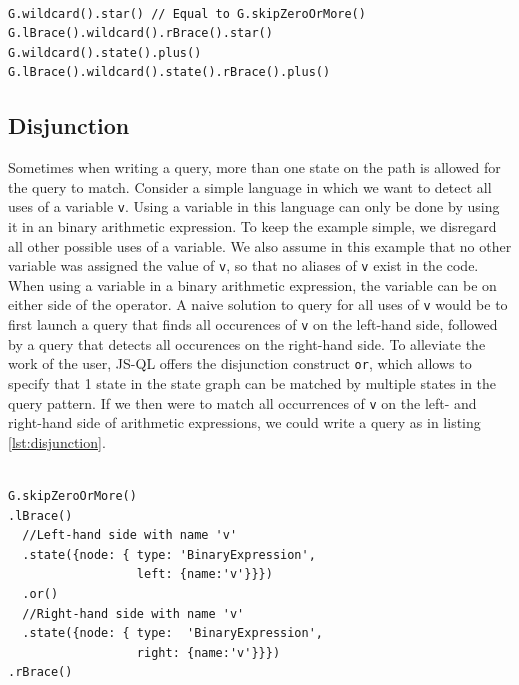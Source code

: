 \begin{lstlisting}[label={lst:KleeneOperations},language=JSQL,caption=Kleene operations differences,mathescape=true]  % float=t?

G.wildcard().star() // Equal to G.skipZeroOrMore()
G.lBrace().wildcard().rBrace().star()
G.wildcard().state().plus()
G.lBrace().wildcard().state().rBrace().plus()
\end{lstlisting}

\subsection{Disjunction}

Sometimes when writing a query, more than one state on the path is allowed for the query to match. Consider a simple language in which we want to detect all uses of a variable \texttt{v}. Using a variable in this language can only be done by using it in an binary arithmetic expression. To keep the example simple, we disregard all other possible uses of a variable. We also assume in this example that no other variable was assigned the value of \texttt{v}, so that no aliases of \texttt{v} exist in the code. When using a variable in a binary arithmetic expression, the variable can be on either side of the operator. A naive solution to query for all uses of \texttt{v} would be to first launch a query that finds all occurences of \texttt{v} on the left-hand side, followed by a query that detects all occurences on the right-hand side. To alleviate the work of the user, JS-QL offers the disjunction construct \texttt{or}, which allows to specify that 1 state in the state graph can be matched by multiple states in the query pattern. If we then were to match all occurrences of \texttt{v} on the left- and right-hand side of arithmetic expressions, we could write a query as in listing \ref{lst:disjunction}.

\begin{lstlisting}[label={lst:disjunction},language=JSQL,caption=The JS-QL disjunction operator,mathescape=true]  % float=t?

G.skipZeroOrMore()
.lBrace()
  //Left-hand side with name 'v'
  .state({node: { type: 'BinaryExpression',
                  left: {name:'v'}}})      
  .or()
  //Right-hand side with name 'v'
  .state({node: { type:  'BinaryExpression',
                  right: {name:'v'}}})
.rBrace()
\end{lstlisting}

